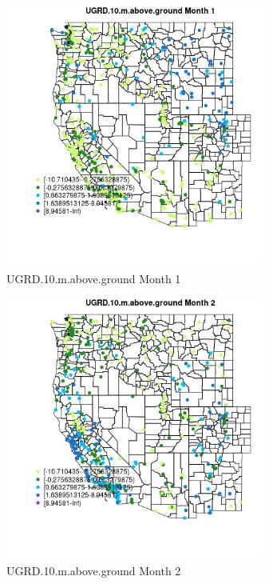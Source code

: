 \begin{figure} 
\centering  
\includegraphics[width=0.77\textwidth]{Code_Outputs/Report_ML_input_PM25_Step4_part_e_de_duplicated_aves_compiled_2019-05-18wNAs_MapObsMo1UGRD10maboveground.jpg} 
\caption{\label{fig:Report_ML_input_PM25_Step4_part_e_de_duplicated_aves_compiled_2019-05-18wNAsMapObsMo1UGRD10maboveground}UGRD.10.m.above.ground Month 1} 
\end{figure} 
 

\clearpage 

\begin{figure} 
\centering  
\includegraphics[width=0.77\textwidth]{Code_Outputs/Report_ML_input_PM25_Step4_part_e_de_duplicated_aves_compiled_2019-05-18wNAs_MapObsMo2UGRD10maboveground.jpg} 
\caption{\label{fig:Report_ML_input_PM25_Step4_part_e_de_duplicated_aves_compiled_2019-05-18wNAsMapObsMo2UGRD10maboveground}UGRD.10.m.above.ground Month 2} 
\end{figure} 
 


